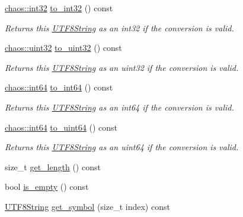 \begin{DoxyCompactItemize}
\hyperlink{namespacechaos_ad1de7efb430365afd2c9446a0f522a90}{chaos\+::int32} \hyperlink{classchaos_1_1str_1_1_u_t_f8_string_a17309b0f4d25be1b83a188883c4a9861}{to\+\_\+int32} () const 
\begin{DoxyCompactList}\small\item\em Returns this \hyperlink{classchaos_1_1str_1_1_u_t_f8_string}{U\+T\+F8\+String} as an int32 if the conversion is valid. \end{DoxyCompactList}\item 
\hyperlink{namespacechaos_a3b3a47ba1e284655bf1a30c441121c60}{chaos\+::uint32} \hyperlink{classchaos_1_1str_1_1_u_t_f8_string_a85ec2ebfdb419a3422cf87497cabdd86}{to\+\_\+uint32} () const 
\begin{DoxyCompactList}\small\item\em Returns this \hyperlink{classchaos_1_1str_1_1_u_t_f8_string}{U\+T\+F8\+String} as an uint32 if the conversion is valid. \end{DoxyCompactList}\item 
\hyperlink{namespacechaos_a46c61f58d99879b936f58234b9a05e0c}{chaos\+::int64} \hyperlink{classchaos_1_1str_1_1_u_t_f8_string_a18eee1b350d45995e43ef41cfd8bb92a}{to\+\_\+int64} () const 
\begin{DoxyCompactList}\small\item\em Returns this \hyperlink{classchaos_1_1str_1_1_u_t_f8_string}{U\+T\+F8\+String} as an int64 if the conversion is valid. \end{DoxyCompactList}\item 
\hyperlink{namespacechaos_a46c61f58d99879b936f58234b9a05e0c}{chaos\+::int64} \hyperlink{classchaos_1_1str_1_1_u_t_f8_string_a5ef3a02131444e2a90b634dad7edb19e}{to\+\_\+uint64} () const 
\begin{DoxyCompactList}\small\item\em Returns this \hyperlink{classchaos_1_1str_1_1_u_t_f8_string}{U\+T\+F8\+String} as an uint64 if the conversion is valid. \end{DoxyCompactList}\item 
size\+\_\+t \hyperlink{classchaos_1_1str_1_1_u_t_f8_string_ac0c724e649182e02462b48b94d1f5bf7}{get\+\_\+length} () const 
\item 
bool \hyperlink{classchaos_1_1str_1_1_u_t_f8_string_a4fc296e90fbbc45a1e3f142dcd1e9853}{is\+\_\+empty} () const 
\item 
\hyperlink{classchaos_1_1str_1_1_u_t_f8_string}{U\+T\+F8\+String} \hyperlink{classchaos_1_1str_1_1_u_t_f8_string_a04dbe9f15dc1b09c858e2450de26d40a}{get\+\_\+symbol} (size\+\_\+t index) const 

\end{DoxyCompactItemize}

